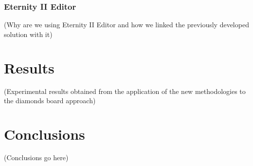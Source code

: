 \documentclass{llncs}
\begin{document}
\subsubsection{Eternity II Editor}\label{sec:eternity2_editor}

(Why are we using Eternity II Editor and how we linked the previously developed solution with it)

\section{Results}\label{sec:results}

(Experimental results obtained from the application of the new methodologies to the diamonds board approach)

\section{Conclusions}\label{sec:conclusions}

(Conclusions go here)
%
%


\end{document}
